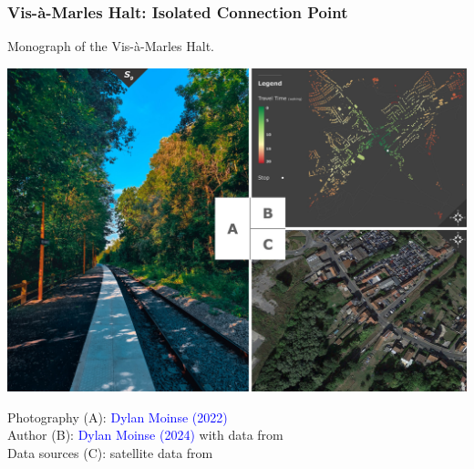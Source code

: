 \begin{refsegment}
\subsubsection*{Vis-à-Marles Halt: Isolated Connection Point
    \label{chap3:application-observation-quantitative-vis-a-marles}
    }

\begin{carte}[h!]\vspace*{4pt}
\caption{Monograph of the Vis-à-Marles Halt.}
\label{fig-chap3:monographie-vis-a-marles}
\centerline{\includegraphics[height=.35\pageheight]{src/Figures/Chap-3/EN_Gare_VisaMarles.jpg}}
\vspace{5pt}
\begin{flushright}\scriptsize{
Photography (A): \textcolor{blue}{Dylan Moinse (2022)}
\\
Author (B): \textcolor{blue}{Dylan Moinse (2024)} with data from \textcolor{blue}{\textcite{openstreetmap_openstreetmap_2023}}
\\
Data sources (C): satellite data from \textcolor{blue}{\textcite{google_earth_google_2023}}
}\end{flushright}
\end{carte}


\end{refsegment}

